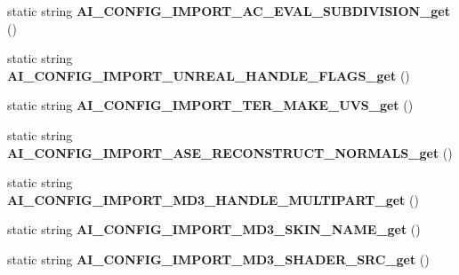 \begin{DoxyCompactItemize}
\item 
\hypertarget{class_assimp_p_i_n_v_o_k_e_a4141225474aad6628514064d32522b15}{static string {\bfseries A\+I\+\_\+\+C\+O\+N\+F\+I\+G\+\_\+\+I\+M\+P\+O\+R\+T\+\_\+\+A\+C\+\_\+\+E\+V\+A\+L\+\_\+\+S\+U\+B\+D\+I\+V\+I\+S\+I\+O\+N\+\_\+get} ()}\label{class_assimp_p_i_n_v_o_k_e_a4141225474aad6628514064d32522b15}

\item 
\hypertarget{class_assimp_p_i_n_v_o_k_e_ac9e2cb527dd42a01a2bf581a35141dc4}{static string {\bfseries A\+I\+\_\+\+C\+O\+N\+F\+I\+G\+\_\+\+I\+M\+P\+O\+R\+T\+\_\+\+U\+N\+R\+E\+A\+L\+\_\+\+H\+A\+N\+D\+L\+E\+\_\+\+F\+L\+A\+G\+S\+\_\+get} ()}\label{class_assimp_p_i_n_v_o_k_e_ac9e2cb527dd42a01a2bf581a35141dc4}

\item 
\hypertarget{class_assimp_p_i_n_v_o_k_e_a461f55171d92caf7134ecf077b64a1e5}{static string {\bfseries A\+I\+\_\+\+C\+O\+N\+F\+I\+G\+\_\+\+I\+M\+P\+O\+R\+T\+\_\+\+T\+E\+R\+\_\+\+M\+A\+K\+E\+\_\+\+U\+V\+S\+\_\+get} ()}\label{class_assimp_p_i_n_v_o_k_e_a461f55171d92caf7134ecf077b64a1e5}

\item 
\hypertarget{class_assimp_p_i_n_v_o_k_e_a8e7e18c4a0d3cfb9a8b3bd15d2d2dbad}{static string {\bfseries A\+I\+\_\+\+C\+O\+N\+F\+I\+G\+\_\+\+I\+M\+P\+O\+R\+T\+\_\+\+A\+S\+E\+\_\+\+R\+E\+C\+O\+N\+S\+T\+R\+U\+C\+T\+\_\+\+N\+O\+R\+M\+A\+L\+S\+\_\+get} ()}\label{class_assimp_p_i_n_v_o_k_e_a8e7e18c4a0d3cfb9a8b3bd15d2d2dbad}

\item 
\hypertarget{class_assimp_p_i_n_v_o_k_e_ad0c1bdedd8634be2c0f01fef9e3a26d0}{static string {\bfseries A\+I\+\_\+\+C\+O\+N\+F\+I\+G\+\_\+\+I\+M\+P\+O\+R\+T\+\_\+\+M\+D3\+\_\+\+H\+A\+N\+D\+L\+E\+\_\+\+M\+U\+L\+T\+I\+P\+A\+R\+T\+\_\+get} ()}\label{class_assimp_p_i_n_v_o_k_e_ad0c1bdedd8634be2c0f01fef9e3a26d0}

\item 
\hypertarget{class_assimp_p_i_n_v_o_k_e_a752c6454c305b3bf0b5a41621b6a8bcc}{static string {\bfseries A\+I\+\_\+\+C\+O\+N\+F\+I\+G\+\_\+\+I\+M\+P\+O\+R\+T\+\_\+\+M\+D3\+\_\+\+S\+K\+I\+N\+\_\+\+N\+A\+M\+E\+\_\+get} ()}\label{class_assimp_p_i_n_v_o_k_e_a752c6454c305b3bf0b5a41621b6a8bcc}

\item 
\hypertarget{class_assimp_p_i_n_v_o_k_e_a06c73492b1a0961dd490acd603666970}{static string {\bfseries A\+I\+\_\+\+C\+O\+N\+F\+I\+G\+\_\+\+I\+M\+P\+O\+R\+T\+\_\+\+M\+D3\+\_\+\+S\+H\+A\+D\+E\+R\+\_\+\+S\+R\+C\+\_\+get} ()}\label{class_assimp_p_i_n_v_o_k_e_a06c73492b1a0961dd490acd603666970}


\end{DoxyCompactItemize}
